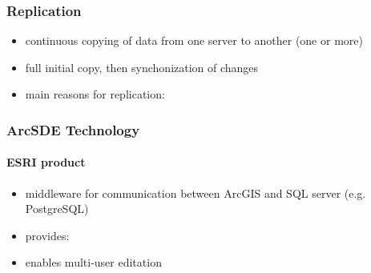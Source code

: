 \documentclass[xcolor=dvipsnames, 14pt]{beamer}
\begin{document}
  \begin{frame}
    \frametitle{Replication}
    \begin{itemize}
      \item continuous copying of data from one server to another (one or more)
      \item full initial copy, then synchonization of changes
      \item main reasons for replication:
        \begin{itemize}
        \end{itemize}
    \end{itemize} 
  \end{frame}


  \begin{frame}
    \frametitle{ArcSDE Technology}
    \framesubtitle{ESRI product}
    \begin{itemize}
        \item middleware for communication between ArcGIS and SQL server (e.g. PostgreSQL)
        \item provides:
        \item enables multi-user editation
    \end{itemize} 
  \end{frame}
\end{document}
